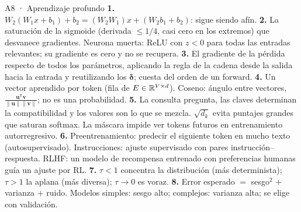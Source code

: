 \begin{solucion}{A8 · Aprendizaje profundo}
\textbf{1.} $W_2(W_1x+b_1)+b_2=(W_2W_1)x+(W_2b_1+b_2)$: sigue siendo afín.
\textbf{2.} La saturación de la sigmoide (derivada $\le1/4$, casi cero en los extremos) que desvanece gradientes. Neurona muerta: ReLU con
$z<0$ para todas las entradas relevantes; su gradiente es cero y no se recupera.
\textbf{3.} El gradiente de la pérdida respecto de todos los parámetros, aplicando la regla de la cadena desde la salida hacia la entrada y
reutilizando los $\boldsymbol\delta$; cuesta del orden de un forward.
\textbf{4.} Un vector aprendido por token (fila de $E\in\mathbb{R}^{V\times d}$). Coseno: ángulo entre vectores, $\frac{\mathbf u^\mathsf T\mathbf v}{\|\mathbf u\|\|\mathbf v\|}$; no es una probabilidad.
\textbf{5.} La consulta pregunta, las claves determinan la compatibilidad y los valores son lo que se mezcla. $\sqrt{d_k}$ evita puntajes
grandes que saturan softmax. La máscara impide ver tokens futuros en entrenamiento autorregresivo.
\textbf{6.} Preentrenamiento: predecir el siguiente token en mucho texto (autosupervisado). Instrucciones: ajuste supervisado con pares
instrucción–respuesta. RLHF: un modelo de recompensa entrenado con preferencias humanas guía un ajuste por RL.
\textbf{7.} $\tau<1$ concentra la distribución (más determinista); $\tau>1$ la aplana (más diversa); $\tau\to0$ es voraz.
\textbf{8.} Error esperado $=$ sesgo$^2$ $+$ varianza $+$ ruido. Modelos simples: sesgo alto; complejos: varianza alta; se elige con validación.
\end{solucion}

